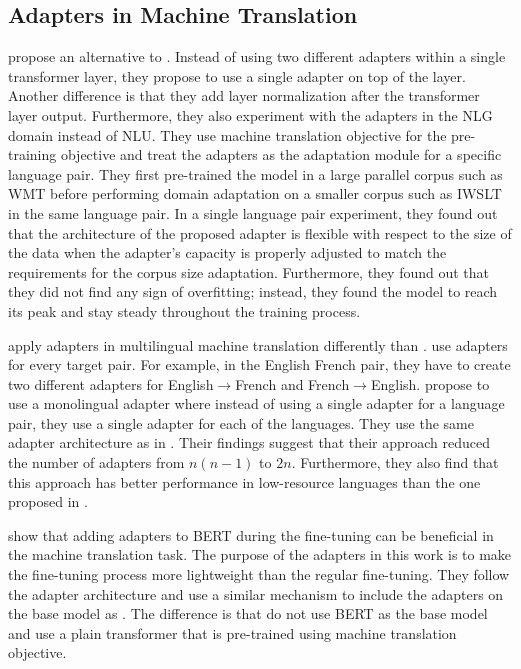 \subsection{Adapters in Machine Translation}
\label{sec:app_mt}
\cite{bapna2019simple} propose an alternative to \cite{houlsby2019parameter}. Instead of using two different adapters within a single transformer layer, they propose to use a single adapter on top of the layer. Another difference is that they add layer normalization after the transformer layer output. Furthermore, they also experiment with the adapters in the NLG domain instead of NLU. They use machine translation objective for the pre-training objective and treat the adapters as the adaptation module for a specific language pair. They first pre-trained the model in a large parallel corpus such as WMT before performing domain adaptation on a smaller corpus such as IWSLT in the same language pair. In a single language pair experiment, they found out that the architecture of the proposed adapter is flexible with respect to the size of the data when the adapter's capacity is properly adjusted to match the requirements for the corpus size adaptation. Furthermore, they found out that they did not find any sign of overfitting; instead, they found the model to reach its peak and stay steady throughout the training process.

\cite{philip2020monolingual} apply adapters in multilingual machine translation differently than \cite{bapna2019simple}. \cite{bapna2019simple} use adapters for every target pair. For example, in the English French pair, they have to create two different adapters for English$\rightarrow$French and French$\rightarrow$English. \cite{philip2020monolingual} propose to use a monolingual adapter where instead of using a single adapter for a language pair, they use a single adapter for each of the languages. They use the same adapter architecture as in \cite{bapna2019simple}. Their findings suggest that their approach reduced the number of adapters from $n(n-1)$ to $2n$. Furthermore, they also find that this approach has better performance in low-resource languages than the one proposed in \cite{bapna2019simple}.

\cite{guo2021adaptive} show that adding adapters to BERT during the fine-tuning can be beneficial in the machine translation task. The purpose of the adapters in this work is to make the fine-tuning process more lightweight than the regular fine-tuning. They follow the adapter architecture and use a similar mechanism to include the adapters on the base model as \cite{bapna2019simple}. The difference is that \cite{bapna2019simple} do not use BERT as the base model and use a plain transformer that is pre-trained using machine translation objective.



